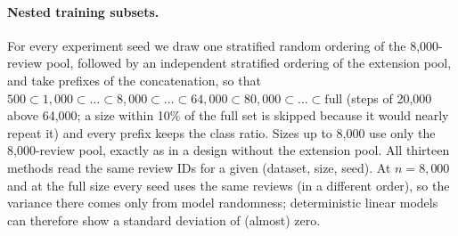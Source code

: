 \paragraph{Nested training subsets.}
For every experiment seed we draw one stratified random ordering of the 8{,}000-review
pool, followed by an independent stratified ordering of the extension pool, and take
prefixes of the concatenation, so that $500 \subset 1{,}000 \subset \dots \subset 8{,}000
\subset \dots \subset 64{,}000 \subset 80{,}000 \subset \dots \subset \text{full}$ (steps of 20{,}000 above
64{,}000; a size within 10\% of the full set is skipped because it would nearly repeat it) and every prefix keeps
the class ratio. Sizes up to 8{,}000 use only the 8{,}000-review pool, exactly as in a
design without the extension pool. All thirteen methods read the same review IDs for a given
(dataset, size, seed). At $n=8{,}000$ and at the full size every seed uses the same
reviews (in a different order), so the variance there comes only from model randomness;
deterministic linear models can therefore show a standard deviation of (almost) zero.

\begin{table}[t]
  \centering
  \caption{Dataset statistics and data splits. ``Confl.''\ = texts removed because
  their copies carry conflicting labels; ``Dup.''\ = removed exact duplicates;
  ``Kiwi-0'' = reviews with no Kiwi tokens; ``Other'' = malformed lines, neutral ratings
  and (NSMC) test reviews also present in the training file. Token counts use the Kiwi
  morpheme tokenizer; ``Trunc.'' is the share of reviews longer than the neural maximum
  length (\maxSeqLenKiwi{} morphemes).}
  \label{tab:data}
  
\end{table}
